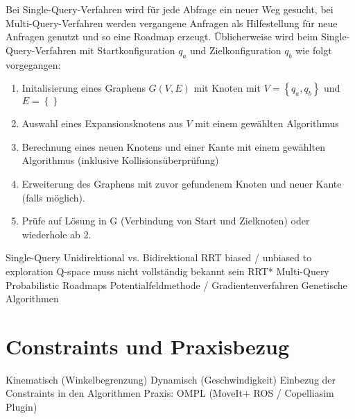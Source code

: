 Bei Single-Query-Verfahren wird für jede Abfrage ein neuer Weg gesucht, bei Multi-Query-Verfahren werden vergangene Anfragen als Hilfestellung für neue Anfragen genutzt und so eine Roadmap erzeugt.
Üblicherweise wird beim Single-Query-Verfahren mit Startkonfiguration $q_a$ und Zielkonfiguration $q_b$ wie folgt vorgegangen:
\begin{enumerate}
    \item Initalisierung eines Graphens $G(V, E)$ mit Knoten mit $V=\left\{ q_a, q_b \right\}$ und $E=\left\{  \right\}$
    \item Auswahl eines Expansionsknotens aus $V$ mit einem gewählten Algorithmus
    \item Berechnung eines neuen Knotens und einer Kante mit einem gewählten Algorithmus (inklusive Kollisionsüberprüfung)
    \item Erweiterung des Graphens mit zuvor gefundenem Knoten und neuer Kante (falls möglich).
    \item Prüfe auf Lösung in G (Verbindung von Start und Zielknoten) oder wiederhole ab 2.
\end{enumerate}

Single-Query
Unidirektional vs. Bidirektional
RRT
biased / unbiased to exploration
Q-space muss nicht vollständig bekannt sein
RRT*
Multi-Query
Probabilistic Roadmaps
Potentialfeldmethode / Gradientenverfahren
Genetische Algorithmen


\section{Constraints und Praxisbezug}
Kinematisch (Winkelbegrenzung)
Dynamisch (Geschwindigkeit)
Einbezug der Constraints in den Algorithmen
Praxis: OMPL (MoveIt+ ROS / Copelliasim Plugin)

